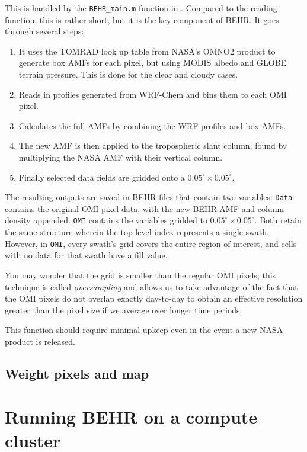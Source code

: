 \documentclass[12pt]{article}
\begin{document}
		This is handled by the \texttt{BEHR\_main.m} function in . Compared to the reading function, this is rather short, but it is the key component of BEHR. It goes through several steps:
		\begin{enumerate}
			\item It uses the TOMRAD look up table from NASA's OMNO2 product to generate box AMFs for each pixel, but using MODIS albedo and GLOBE terrain pressure.  This is done for the clear and cloudy cases.
			\item Reads in  profiles generated from WRF-Chem and bins them to each OMI pixel.
			\item Calculates the full AMFs by combining the WRF profiles and box AMFs.
			\item The new AMF is then applied to the tropospheric slant column, found by multiplying the NASA AMF with their vertical column.
			\item Finally selected data fields are gridded onto a $0.05^\circ \times 0.05^\circ$.  
		\end{enumerate}
		
		The resulting outputs are saved in BEHR files that contain two variables: \texttt{Data} contains the original OMI pixel data, with the new BEHR AMF and  column density appended. \texttt{OMI} contains the variables gridded to $0.05^\circ \times 0.05^\circ$. Both retain the same structure wherein the top-level index represents a single swath.  However, in \texttt{OMI}, every swath's grid covers the entire region of interest, and cells with no data for that swath have a fill value.
		
		You may wonder that the grid is smaller than the regular OMI pixels; this technique is called \emph{oversampling} and allows us to take advantage of the fact that the OMI pixels do not overlap exactly day-to-day to obtain an effective resolution greater than the pixel size if we average over longer time periods.
		
		This function should require minimal upkeep even in the event a new NASA product is released.
		
	\subsection{Weight pixels and map}

\section{Running BEHR on a compute cluster} \label{sec:Cluster}
\end{document}

